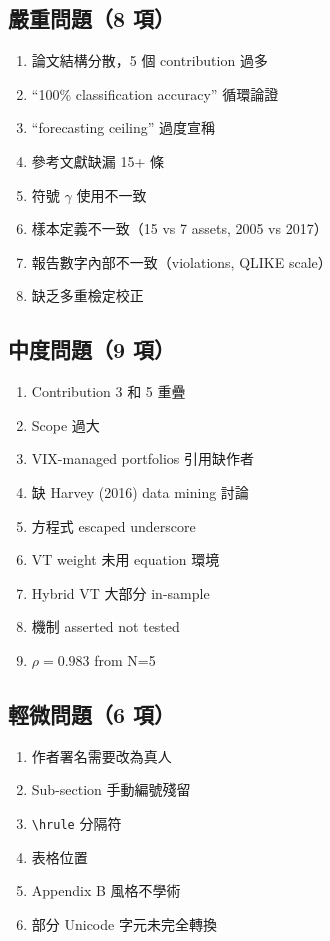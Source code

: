 \documentclass[12pt,a4paper]{article}
\begin{document}
\subsection*{\textcolor{errorred}{嚴重問題（8 項）}}
\begin{enumerate}[label=E\arabic*]
\item 論文結構分散，5 個 contribution 過多
\item ``100\% classification accuracy'' 循環論證
\item ``forecasting ceiling'' 過度宣稱
\item 參考文獻缺漏 15+ 條
\item 符號 $\gamma$ 使用不一致
\item 樣本定義不一致（15 vs 7 assets, 2005 vs 2017）
\item 報告數字內部不一致（violations, QLIKE scale）
\item 缺乏多重檢定校正
\end{enumerate}

\subsection*{\textcolor{warncolor}{中度問題（9 項）}}
\begin{enumerate}[label=W\arabic*]
\item Contribution 3 和 5 重疊
\item Scope 過大
\item VIX-managed portfolios 引用缺作者
\item 缺 Harvey (2016) data mining 討論
\item 方程式 escaped underscore
\item VT weight 未用 equation 環境
\item Hybrid VT 大部分 in-sample
\item 機制 asserted not tested
\item $\rho = 0.983$ from N=5
\end{enumerate}

\subsection*{輕微問題（6 項）}
\begin{enumerate}
\item 作者署名需要改為真人
\item Sub-section 手動編號殘留
\item \verb|\hrule| 分隔符
\item 表格位置
\item Appendix B 風格不學術
\item 部分 Unicode 字元未完全轉換
\end{enumerate}
\end{document}
